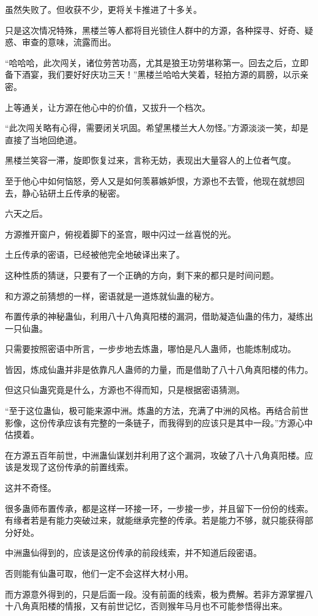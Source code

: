 \begin{this_body}
虽然失败了。但收获不少，更将关卡推进了十多关。

只是这次情况特殊，黑楼兰等人都将目光锁住人群中的方源，各种探寻、好奇、疑惑、审查的意味，流露而出。

“哈哈哈，此次闯关，诸位劳苦功高，尤其是狼王功劳堪称第一。回去之后，立即备下酒宴，我们要好好庆功三天！”黑楼兰哈哈大笑着，轻拍方源的肩膀，以示亲密。

上等通关，让方源在他心中的价值，又拔升一个档次。

“此次闯关略有心得，需要闭关巩固。希望黑楼兰大人勿怪。”方源淡淡一笑，却是直接了当地回绝道。

黑楼兰笑容一滞，旋即恢复过来，言称无妨，表现出大量容人的上位者气度。

至于他心中如何恼怒，旁人又是如何羡慕嫉妒恨，方源也不去管，他现在就想回去，静心钻研土丘传承的秘密。

六天之后。

方源推开窗户，俯视着脚下的圣宫，眼中闪过一丝喜悦的光。

土丘传承的密语，已经被他完全地破译出来了。

这种性质的猜谜，只要有了一个正确的方向，剩下来的都只是时间问题。

和方源之前猜想的一样，密语就是一道炼就仙蛊的秘方。

布置传承的神秘蛊仙，利用八十八角真阳楼的漏洞，借助凝造仙蛊的伟力，凝练出一只仙蛊。

只需要按照密语中所言，一步步地去炼蛊，哪怕是凡人蛊师，也能炼制成功。

皆因，炼成仙蛊并非是依靠凡人蛊师的力量，而是借助了八十八角真阳楼的伟力。

但这只仙蛊究竟是什么，方源也不得而知，只是根据密语猜测。

“至于这位蛊仙，极可能来源中洲。炼蛊的方法，充满了中洲的风格。再结合前世影像，这份传承应该有完整的一条链子，而我得到的应该只是其中一段。”方源心中估摸着。

在方源五百年前世，中洲蛊仙谋划并利用了这个漏洞，攻破了八十八角真阳楼。应该是发现了这份传承的前置线索。

这并不奇怪。

很多蛊师布置传承，都是这样一环接一环，一步接一步，并且留下一份份的线索。有缘者若是有能力突破过来，就能继承完整的传承。若是能力不够，就只能获得部分好处。

中洲蛊仙得到的，应该是这份传承的前段线索，并不知道后段密语。

否则能有仙蛊可取，他们一定不会这样大材小用。

而方源意外得到的，只是后面一段。没有前面的线索，极为费解。若非方源掌握八十八角真阳楼的情报，又有前世记忆，否则猴年马月也不可能参悟得出来。

\end{this_body}

